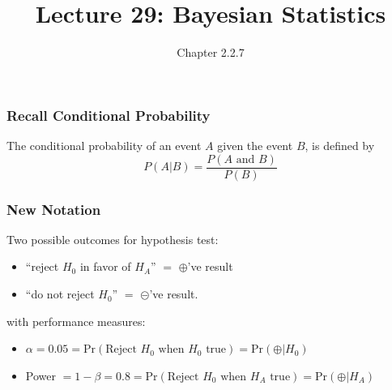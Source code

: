 \documentclass[handout]{beamer}
\title{Lecture 29: Bayesian Statistics}
\author{Chapter 2.2.7}
\date{}
\newcommand{\blue}[1]{\textcolor{blue2}{#1}}
\newcommand{\prob}{\mbox{Pr}}
\newcommand{\cp}{\oplus}
\newcommand{\cm}{\circleddash}
\begin{document}
\begin{frame}
\titlepage
\end{frame}



\begin{frame}
\frametitle{Recall Conditional Probability}

%
%
The \blue{conditional probability} of an event $A$ given the event $B$, is defined by
\[
P(A|B) = \frac{P(A \mbox{ and } B)}{P(B)}
\]  

\end{frame}



\begin{frame}
\frametitle{New Notation}

%
%
Two possible outcomes for hypothesis test:
\begin{itemize}
\item ``reject $H_0$ in favor of $H_A$'' $=$ $\cp$'ve result
\item ``do not reject $H_0$'' $=$ $\cm$'ve result.
\end{itemize}
\pause
\vspace{0.5cm}

with performance measures:
\begin{itemize}
\item $\alpha=0.05=\prob(\mbox{Reject } H_0 \mbox{ when $H_0$ true}) = \prob(\cp|H_0)$
\item Power $=1-\beta=0.8=\prob(\mbox{Reject } H_0 \mbox{ when $H_A$ true}) = \prob(\cp|H_A)$
\end{itemize} 

\end{frame}
\end{document}
